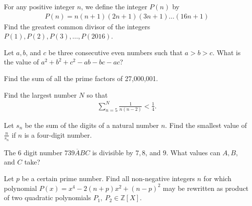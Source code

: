 \documentclass[problems.tex]{subfile}
\begin{document}
	\begin{problem}
		For any positive integer $n$, we define the integer $P(n)$ by
		\begin{align*}
			P(n)=n(n+1)(2n+1)(3n+1)\dots(16n+1)
		\end{align*}
		Find the greatest common divisor of the integers $P(1), P(2), P(3),\dots,P(2016)$. %
	\end{problem}

	\begin{problem}
		Let $a, b$, and $c$ be three consecutive even numbers such that $a > b > c$. What is the value of $a^2 + b^2 + c^2 - ab - bc - ac$?
	\end{problem}

	\begin{problem}
		Find the sum of all the prime factors of 27,000,001.
	\end{problem}

	\begin{problem}
		Find the largest number $N$ so that
		\begin{align*}
			\sum_{n=5}^{N} \frac{1}{n(n-2)} < \frac{1}{4}.
		\end{align*}
	\end{problem}

	\begin{problem}
		Let $s_n$ be the sum of the digits of a natural number $n$. Find the smallest value of $\frac{n}{s_n}$ if $n$ is a four-digit number.
	\end{problem}

	\begin{problem}
		The $6$ digit number $\overline{739ABC}$ is divisible by $7, 8$, and $9$. What values can $A, B$, and $C$ take?
	\end{problem}

	\begin{problem}
		Let $p$ be a certain prime number. Find all non-negative integers $n$ for which polynomial $P(x)=x^4-2(n+p)x^2+(n-p)^2$ may be rewritten as product of two quadratic polynomials $P_1, \ P_2 \in \mathbb{Z}[X]$. %
	\end{problem}
\end{document}
